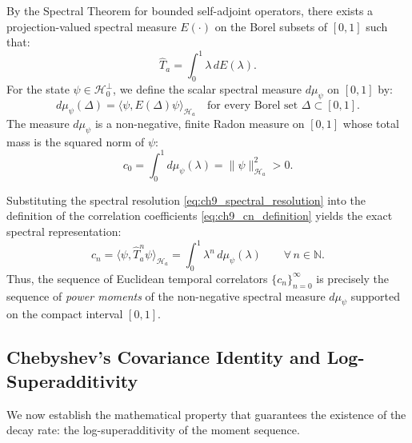By the Spectral Theorem for bounded self-adjoint operators, there exists a projection-valued spectral measure $E(\cdot)$ on the Borel subsets of $[0, 1]$ such that:
\begin{equation}
\label{eq:ch9_spectral_resolution}
\hat{T}_a = \int_0^1 \lambda \, dE(\lambda).
\end{equation}
For the state $\psi \in \mathcal{H}_0^\perp$, we define the scalar spectral measure $d\mu_\psi$ on $[0, 1]$ by:
\begin{equation}
\label{eq:ch9_scalar_spectral_measure}
d\mu_\psi(\Delta) = \langle \psi, E(\Delta) \psi \rangle_{\mathcal{H}_a} \quad \text{for every Borel set } \Delta \subset [0, 1].
\end{equation}
The measure $d\mu_\psi$ is a non-negative, finite Radon measure on $[0, 1]$ whose total mass is the squared norm of $\psi$:
\begin{equation}
c_0 = \int_0^1 d\mu_\psi(\lambda) = \|\psi\|_{\mathcal{H}_a}^2 > 0.
\end{equation}

Substituting the spectral resolution \eqref{eq:ch9_spectral_resolution} into the definition of the correlation coefficients \eqref{eq:ch9_cn_definition} yields the exact spectral representation:
\begin{equation}
\label{eq:ch9_spectral_moment_integral}
c_n = \langle \psi, \hat{T}_a^n \psi \rangle_{\mathcal{H}_a} = \int_0^1 \lambda^n \, d\mu_\psi(\lambda) \qquad \forall \, n \in \mathbb{N}.
\end{equation}
Thus, the sequence of Euclidean temporal correlators $\{c_n\}_{n=0}^\infty$ is precisely the sequence of \emph{power moments} of the non-negative spectral measure $d\mu_\psi$ supported on the compact interval $[0, 1]$.

\subsection{Chebyshev's Covariance Identity and Log-Superadditivity}
\label{subsec:chebyshev_proof}

We now establish the mathematical property that guarantees the existence of the decay rate: the log-superadditivity of the moment sequence.

